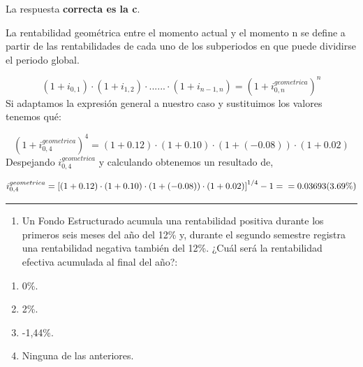 \documentclass[
  letterpaper,
  DIV=11,
  numbers=noendperiod]{scrreprt}
\providecommand{\tightlist}{%
  \setlength{\itemsep}{0pt}\setlength{\parskip}{0pt}}\usepackage{longtable,booktabs,array}
\begin{document}
\begin{tcolorbox}[enhanced jigsaw, left=2mm, opacityback=0, colback=white, breakable, arc=.35mm, bottomrule=.15mm, rightrule=.15mm, toprule=.15mm, leftrule=.75mm, colframe=quarto-callout-tip-color-frame]
\begin{minipage}[t]{5.5mm}
\textcolor{quarto-callout-tip-color}{\faLightbulb}
\end{minipage}%
\begin{minipage}[t]{\textwidth - 5.5mm}

La respuesta \textbf{correcta es la c}.

La rentabilidad geométrica entre el momento actual y el momento n se
define a partir de las rentabilidades de cada uno de los subperiodos en
que puede dividirse el periodo global.

\[\left(1+i_{0,1}\right)\cdot\left(1+i_{1,2}\right)\cdot......\cdot\left(1+i_{n-1,n}\right)=\left(1+i_{0,n}^{geometrica}\right)^n\]
Si adaptamos la expresión general a nuestro caso y sustituimos los
valores tenemos qué:

\[\left(1+i_{0,4}^{geometrica}\right)^4=\left(1+0.12\right)\cdot\left(1+0.10\right)\cdot\left(1+(-0.08)\right)\cdot\left(1+0.02\right)\]
Despejando \(i_{0,4}^{geometrica}\) y calculando obtenemos un resultado
de,

\[i_{0,4}^{geometrica}=\left[\left(1+0.12\right)\cdot\left(1+0.10\right)\cdot\left(1+(-0.08)\right)\cdot\left(1+0.02\right)\right]^{1/4}-1=\\=0.03693(3.69\%)\]

\end{minipage}%
\end{tcolorbox}

\begin{center}\rule{0.5\linewidth}{0.5pt}\end{center}

\begin{enumerate}
\def\labelenumi{\arabic{enumi}.}
\setcounter{enumi}{38}
\tightlist
\item
  Un Fondo Estructurado acumula una rentabilidad positiva durante los
  primeros seis meses del año del 12\% y, durante el segundo semestre
  registra una rentabilidad negativa también del 12\%. ¿Cuál será la
  rentabilidad efectiva acumulada al final del año?:
\end{enumerate}

\begin{enumerate}
\def\labelenumi{\alph{enumi})}
\item
  0\%.
\item
  2\%.
\item
  -1,44\%.
\item
  Ninguna de las anteriores.
\end{enumerate}
\end{document}
